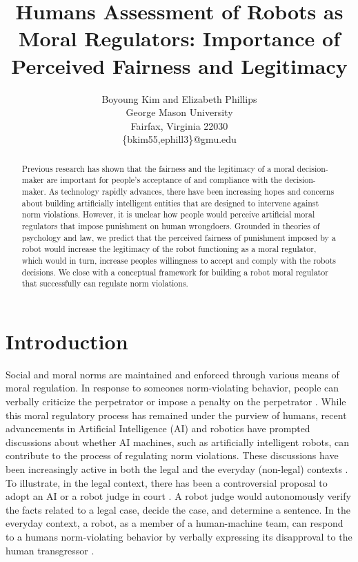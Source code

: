 \documentclass{article} %
\title{Humans Assessment of Robots as Moral Regulators: Importance of Perceived Fairness and Legitimacy}
\author{Boyoung Kim and Elizabeth Phillips\\
{\normalfont George Mason University\\
Fairfax, Virginia 22030\\
\{bkim55,ephill3\}@gmu.edu}}
\begin{document}
\maketitle

\begin{abstract}
Previous research has shown that the fairness and the legitimacy of a moral decision-maker are important for people's acceptance of and compliance with the decision-maker. As technology rapidly advances, there have been increasing hopes and concerns about building artificially intelligent entities that are designed to intervene against norm violations. However, it is unclear how people would perceive artificial moral regulators that impose punishment on human wrongdoers. Grounded in theories of psychology and law, we predict that the perceived fairness of punishment imposed by a robot would increase the legitimacy of the robot functioning as a moral regulator, which would in turn, increase peoples willingness to accept and comply with the robots decisions. We close with a conceptual framework for building a robot moral regulator that successfully can regulate norm violations.
\end{abstract}

\section{Introduction}
Social and moral norms are maintained and enforced through various means of moral regulation. In response to someones norm-violating behavior, people can verbally criticize the perpetrator or impose a penalty on the perpetrator \cite{henrich2006costly}. While this moral regulatory process has remained under the purview of humans, recent advancements in Artificial Intelligence (AI) and robotics have prompted discussions about whether AI machines, such as artificially intelligent robots, can contribute to the process of regulating norm violations. These discussions have been increasingly active in both the legal \cite{branting1998automating,sartor1998introduction,sourdin2018judge} and the everyday (non-legal) contexts \cite{briggs2015sorry,jung2015using,jackson2019tact}. To illustrate, in the legal context, there has been a controversial proposal to adopt an AI or a robot judge in court \cite{ulenaers2020impact,chen2021having,casey2020will}. A robot judge would autonomously verify the facts related to a legal case, decide the case, and determine a sentence. In the everyday context, a robot, as a member of a human-machine team, can respond to a humans norm-violating behavior by verbally expressing its disapproval to the human transgressor \cite{briggs2015sorry,jung2015using,jackson2019tact}.
\end{document}
